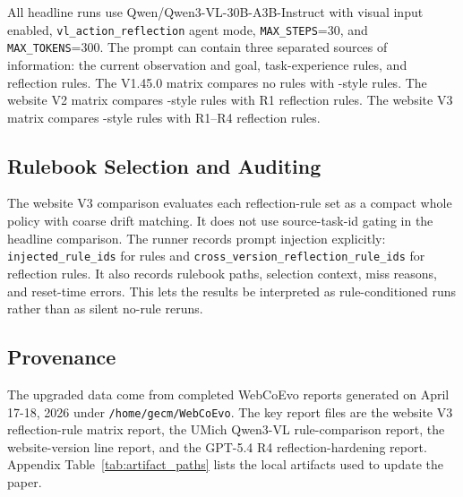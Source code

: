 All headline runs use Qwen/Qwen3-VL-30B-A3B-Instruct with visual input enabled, \texttt{vl\_action\_reflection} agent mode, \texttt{MAX\_STEPS}=30, and \texttt{MAX\_TOKENS}=300. The prompt can contain three separated sources of information: the current observation and goal, \expel{} task-experience rules, and reflection rules. The \linkding{} V1.45.0 matrix compares no rules with \expel{}-style rules. The website V2 matrix compares \expel{}-style rules with R1 reflection rules. The website V3 matrix compares \expel{}-style rules with R1--R4 reflection rules.

\subsection{Rulebook Selection and Auditing}

The website V3 comparison evaluates each reflection-rule set as a compact whole policy with coarse drift matching. It does not use source-task-id gating in the headline comparison. The runner records prompt injection explicitly: \texttt{injected\_rule\_ids} for \expel{} rules and \texttt{cross\_version\_reflection\_rule\_ids} for reflection rules. It also records rulebook paths, selection context, miss reasons, and reset-time errors. This lets the results be interpreted as rule-conditioned runs rather than as silent no-rule reruns.

\subsection{Provenance}

The upgraded data come from completed WebCoEvo reports generated on April 17-18, 2026 under \texttt{/home/gecm/WebCoEvo}. The key report files are the website V3 reflection-rule matrix report, the UMich Qwen3-VL rule-comparison report, the website-version line report, and the GPT-5.4 R4 reflection-hardening report. Appendix Table~\ref{tab:artifact_paths} lists the local artifacts used to update the paper.
